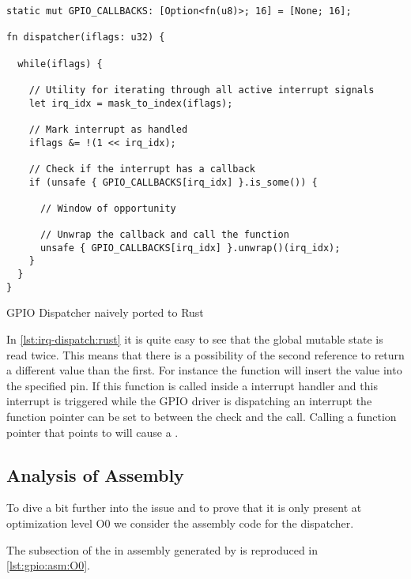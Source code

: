 \begin{listing}
  \begin{verbatim}
static mut GPIO_CALLBACKS: [Option<fn(u8)>; 16] = [None; 16];

fn dispatcher(iflags: u32) {

  while(iflags) {

    // Utility for iterating through all active interrupt signals
    let irq_idx = mask_to_index(iflags);

    // Mark interrupt as handled
    iflags &= !(1 << irq_idx);

    // Check if the interrupt has a callback
    if (unsafe { GPIO_CALLBACKS[irq_idx] }.is_some()) {

      // Window of opportunity

      // Unwrap the callback and call the function
      unsafe { GPIO_CALLBACKS[irq_idx] }.unwrap()(irq_idx);
    }
  }
}
  \end{verbatim}
  \caption{GPIO Dispatcher naively ported to Rust}
  \label{lst:irq-dispatch:rust}
\end{listing}

In \autoref{lst:irq-dispatch:rust} it is quite easy to see that the global mutable state is read twice.
This means that there is a possibility of the second reference to return a different value than the first.
For instance the function  will insert the value  into the specified pin.
If this function is called inside a interrupt handler and this interrupt is triggered while the GPIO driver is dispatching an interrupt the function pointer can be set to  between the check and the call.
Calling a function pointer that points to  will cause a .

\subsection{Analysis of Assembly}
To dive a bit further into the issue and to prove that it is only present at optimization level O0 we consider the assembly code for the dispatcher.

The subsection of the  in assembly generated by  is reproduced in \autoref{lst:gpio:asm:O0}.

